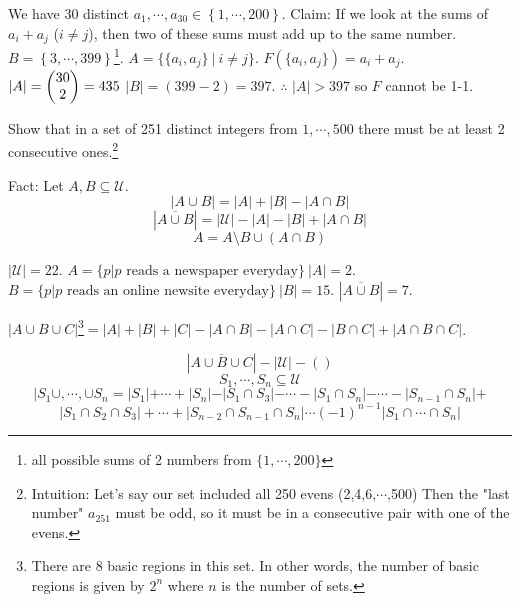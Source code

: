 \begin{example}
We have 30 distinct $a_1,\cdots,a_{30}\in\left\{ 1,\cdots,200\right\}$. Claim: If we look at the sums of $a_i+a_j$ ($i\neq j$), then two of these sums must add up to the same number. $B = \left\{ 3,\cdots,399 \right\}$\footnote{all possible sums of 2 numbers from $\{ 1,\cdots,200 \}$}. $A= \{ \{a_i,a_j\}\ |\ i\neq j\}$. $F(\{a_i,a_j\})=a_i+a_j$. $|A|=\begin{pmatrix}30\\2\end{pmatrix}=435$ $|B|=(399-2)=397$. $\therefore$ $|A| > 397$ so $F$ cannot be 1-1.
\end{example}
\begin{example}Show that in a set of 251 distinct integers from $1,\cdots,500$ there must be at least 2 consecutive ones.\footnote{Intuition: Let's say our set included all 250 evens (2,4,6,$\cdots$,500) Then the "last number" $a_{251}$ must be odd, so it must be in a consecutive pair with one of the evens.}

\end{example}
\noindent
Fact: Let $A,B\subseteq\mathcal{U}$.
\[ |A \cup B|= |A| + |B| - |A \cap B| \]
\[ \left|\overline{A \cup B}\right| = |\mathcal{U}| - |A| - |B| + |A \cap B| \]
\[ A = A\setminus B \cup (A \cap B) \]
\begin{example}
$|\mathcal{U}|=22$. $A = \{ p | p \text{ reads a newspaper everyday} \}\ |A|=2$. $B = \{ p | p \text{ reads an online newsite everyday} \}\ |B|=15$. $\left|\overline{A \cup B} \right|=7$.
\end{example}
\begin{example}
$\left| A \cup B \cup C \right|$\footnote{There are 8 basic regions in this set. In other words, the number of basic regions is given by $2^n$ where $n$ is the number of sets.}$=|A|+|B|+|C|-|A \cap B|-|A \cap C|-|B \cap C|+|A \cap B \cap C|$.
\end{example}
\begin{example}
\[ \left| \overline{A \cup B \cup C}\right|- |\mathcal{U}| - \left( \right) \]
\[ S_1,\cdots,S_n\subseteq\mathcal{U} \]
\[ |S_1\cup,\cdots,\cup S_n = |S_1|+\cdots+|S_n|-|S_1 \cap S_3|-\cdots-|S_1 \cap S_n| -\cdots-|S_{n-1}\cap S_n|+ \]
\[ |S_1 \cap S_2 \cap S_3| +\cdots+ |S_{n-2} \cap S_{n-1} \cap S_n| \cdots (-1)^{n-1}|S_1 \cap \cdots \cap S_n|\]
\end{example}


